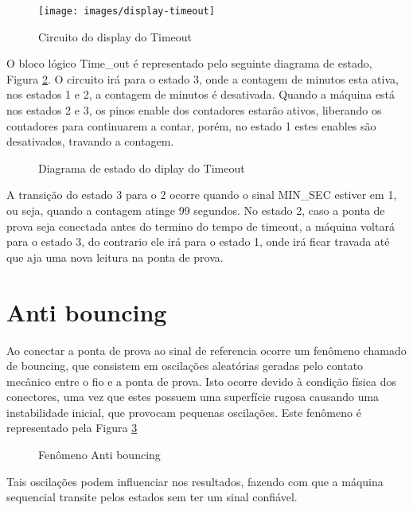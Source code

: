 \documentclass[12pt,a4paper,openany]{abntex2}
\begin{document}
\begin{figure}[!htp]
	\centering
	\caption{Circuito do display do Timeout}
	\texttt{[image: images/display-timeout]}	\label{fig:display-timeout}
\end{figure}

O bloco lógico Time\_out é representado pelo seguinte diagrama de estado, Figura \ref{fig:diagrama-de-estado-display-timeout}. O circuito irá para o estado 3, onde a contagem de minutos esta ativa, nos estados 1 e 2, a contagem de minutos é desativada. Quando a máquina está nos estados 2 e 3, os pinos enable dos contadores estarão ativos, liberando os contadores para continuarem a contar, porém, no estado 1 estes enables são desativados, travando a contagem.

\begin{figure}[!htp]
	\centering
	\caption{Diagrama de estado do diplay do Timeout}
	\label{fig:diagrama-de-estado-display-timeout}
\end{figure}

A transição do estado 3 para o 2 ocorre quando o sinal MIN\_SEC estiver em 1, ou seja, quando a contagem atinge 99 segundos. No estado 2, caso a ponta de prova seja conectada antes do termino do tempo de timeout, a máquina voltará para o estado 3, do contrario ele irá para o estado 1, onde irá ficar travada até que aja uma nova leitura na ponta de prova.

\section{Anti bouncing}

Ao conectar a ponta de prova ao sinal de referencia ocorre um fenômeno chamado de bouncing, que consistem em oscilações aleatórias geradas pelo contato mecânico entre o fio e a ponta de prova. Isto ocorre devido à condição física dos conectores, uma vez que estes possuem uma superfície rugosa causando uma instabilidade inicial, que provocam pequenas oscilações. Este fenômeno é representado pela Figura \ref{fig:bounceTimingDiagram}

\begin{figure}[!htp]
	\centering
	\caption{Fenômeno Anti bouncing}
	\label{fig:bounceTimingDiagram}
\end{figure}

Tais oscilações podem influenciar nos resultados, fazendo com que a máquina sequencial transite pelos estados sem ter um sinal confiável.
\end{document}
